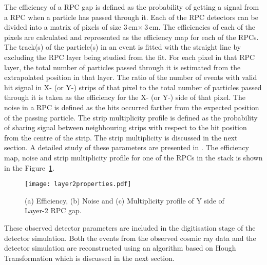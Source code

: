 The efficiency of a RPC gap is defined as the probability of getting
a signal from a RPC when a particle has passed through it.
Each of the RPC detectors can be divided into a matrix of pixels of
size 3\,cm$\times$\,3\,cm. The efficiencies of each of the pixels
are calculated and represented as the efficiency map for each of the
RPCs. The track(s) of the particle(s) in an event is fitted with the
straight line by excluding the RPC layer being studied from the fit.
For each pixel in that RPC layer, the total number of particles passed
through it is estimated from the extrapolated position in that layer.
The ratio of the number of events with valid hit signal in X- (or Y-)
strips of that pixel to the total number of particles passed through
it is taken as the efficiency for the X- (or Y-) side of that pixel.
The noise in a RPC is defined as the hits occurred farther from the
expected position of the passing particle. The strip multiplicity
profile is defined as the probability of sharing signal between
neighbouring strips with respect to the hit position from the centre
of the strip. The strip multiplicity is discussed in the next section.
A detailed study of these parameters are presented in \cite{pethu1}.
The efficiency map, noise and strip multiplicity
profile for one of the RPCs in the stack is shown in the
Figure~\ref{fig:layer2y}.
\begin{figure}[h]
  \centering
  \texttt{[image: layer2properties.pdf]} 
  \caption{(a) Efficiency, (b) Noise and (c) Multiplicity profile of
    Y side of Layer-2 RPC gap.}
  \label{fig:layer2y}
\end{figure}
These observed detector parameters are included in the digitisation
stage of the detector simulation. Both the events from the observed
cosmic ray data and the detector simulation are reconstructed using
an algorithm based on Hough Transformation which is discussed in the
next section.

